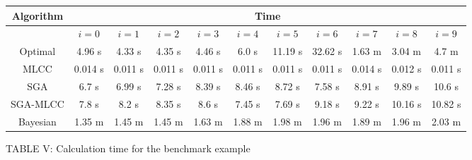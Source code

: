 \documentclass[lettersize,journal]{IEEEtran}
\begin{document}
\begin{figure}[h!]
  \begin{minipage}{\textwidth}
    \centering
    \captionsetup{labelformat=empty} %
    \renewcommand{\thetable}{TABLE \arabic{table}} %
    \footnotesize
    \begin{tabular}{|c|c|c|c|c|c|c|c|c|c|c|}
    \hline
    \textbf{Algorithm} & \multicolumn{10}{|c|}{\textbf{Time}} \\ \hline
     & $i = 0$ & $i = 1$ & $i = 2$ & $i = 3$ & $i = 4$ & $i = 5$ & $i = 6$ & $i = 7$ & $i = 8$ & $i = 9$ \\ \hline
    Optimal & 4.96 s & 4.33 s & 4.35 s & 4.46 s & 6.0 s & 11.19 s & 32.62 s & 1.63 m & 3.04 m & 4.7 m \\ \hline
 MLCC & 0.014 s & 0.011 s & 0.011 s & 0.011 s & 0.011 s & 0.011 s & 0.011 s & 0.014 s & 0.012 s & 0.011 s \\ \hline
SGA & 6.7 s & 6.99 s & 7.28 s & 8.39 s & 8.46 s & 8.72 s & 7.58 s & 8.91 s & 9.89 s & 10.6 s \\ \hline
SGA-MLCC & 7.8 s & 8.2 s & 8.35 s & 8.6 s & 7.45 s & 7.69 s & 9.18 s & 9.22 s & 10.16 s & 10.82 s \\ \hline
Bayesian & 1.35 m & 1.45 m & 1.45 m & 1.63 m & 1.88 m & 1.98 m & 1.96 m & 1.89 m & 1.96 m & 2.03 m \\ \hline
    \end{tabular}
    \caption{TABLE V: Calculation time for the benchmark example}
    \label{bench_mark_time_table}
  \end{minipage}
\end{figure}
\newpage
\end{document}
